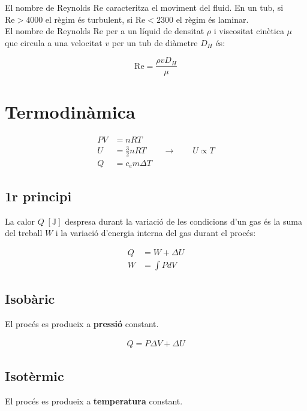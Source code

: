 El nombre de Reynolds  Re caracteritza el moviment del fluid. En un tub, si
$\mathrm{Re} > 4000$ el règim és turbulent, si $\mathrm{Re} < 2300$ el règim és laminar.\\

El nombre de Reynolds Re per a un líquid de densitat $\rho$ i viscositat cinètica $\mu$ que circula a una velocitat $v$ per un tub de diàmetre $D_H$ és:

\begin{equation}
    \mathrm{Re} = \frac{\rho v D_H}{\mu} 
\end{equation}

\section{Termodinàmica}
\label{sec:termodinamica}

\begin{align}
    PV &= nRT \\
    U &= \frac{3}{2}nRT \qquad \rightarrow \qquad U \propto T \\
    Q &= c_em\Delta T
\end{align}

\subsection{1r principi}
\label{sub:1r_principi}

La calor $Q\;[\si{\joule}]$ despresa durant la variació de les condicions d'un
gas és la suma del treball $W$ i la variació d'energia interna del gas durant
el procés:

\begin{align}
    Q &= W + \Delta U \\
    W &= \int P dV
\end{align}

\subsection{Isobàric}
\label{sub:isobaric}
El procés es produeix a \textbf{pressió} constant.

\begin{align}
    Q = P \Delta V + \Delta U
\end{align}

\subsection{Isotèrmic}
\label{sub:isotermic}
El procés es produeix a \textbf{temperatura} constant.

